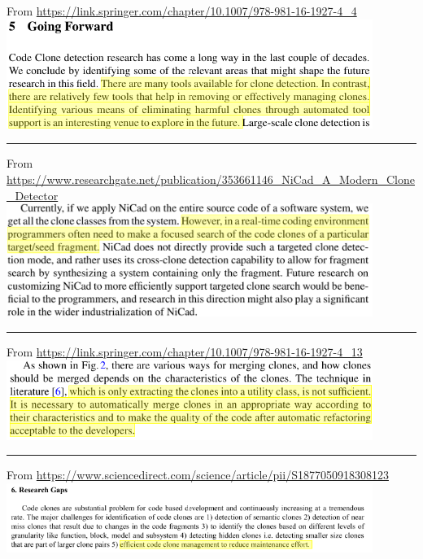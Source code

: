 \documentclass[12pt]{article}
\begin{document}
\begin{center}

    From \url{https://link.springer.com/chapter/10.1007/978-981-16-1927-4_4}
    \includegraphics[width=450px]{images/sourcerercc.png}
    \noindent\rule{8cm}{0.4pt}

    From \url{https://www.researchgate.net/publication/353661146_NiCad_A_Modern_Clone_Detector}
    \includegraphics[width=450px]{images/nicadquote.png}
    \noindent\rule{8cm}{0.4pt}

    From \url{https://link.springer.com/chapter/10.1007/978-981-16-1927-4_13}
    \includegraphics[width=450px]{images/refactoringoriented.png}
    \noindent\rule{8cm}{0.4pt}

    From \url{https://www.sciencedirect.com/science/article/pii/S1877050918308123}
    \includegraphics[width=450px]{images/managementquote.png}
\end{center}
\end{document}
